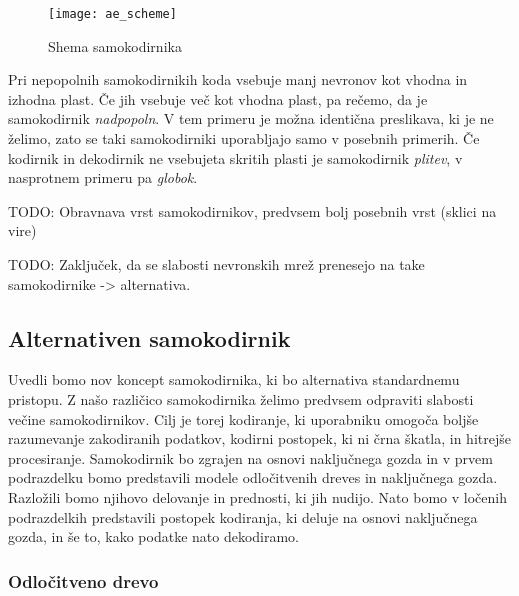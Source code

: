 \documentclass[12pt,a4paper]{article}
\begin{document}
\begin{figure}[h!]

\begin{center}
\texttt{[image: ae\_scheme]}
\end{center}

\caption{Shema samokodirnika}
\end{figure}

Pri nepopolnih samokodirnikih koda vsebuje manj nevronov kot vhodna in izhodna plast. 
Če jih vsebuje več kot vhodna plast, pa rečemo, da je samokodirnik \emph{nadpopoln}. 
V tem primeru je možna identična preslikava, ki je ne želimo, zato se taki samokodirniki uporabljajo samo v posebnih primerih. 
Če kodirnik in dekodirnik ne vsebujeta skritih plasti je samokodirnik \emph{plitev}, v nasprotnem primeru pa \emph{globok}.


TODO: Obravnava vrst samokodirnikov, predvsem bolj posebnih vrst (sklici na vire)

TODO: Zaključek, da se slabosti nevronskih mrež prenesejo na take samokodirnike -> alternativa.



\subsection{Alternativen samokodirnik}

Uvedli bomo nov koncept samokodirnika, ki bo alternativa standardnemu pristopu. 
Z našo različico samokodirnika želimo predvsem odpraviti slabosti večine samokodirnikov. 
Cilj je torej kodiranje, ki uporabniku omogoča boljše razumevanje zakodiranih podatkov, kodirni postopek, ki ni črna škatla, in hitrejše procesiranje. 
Samokodirnik bo zgrajen na osnovi naključnega gozda in v prvem podrazdelku bomo predstavili modele odločitvenih dreves in naključnega gozda. 
Razložili bomo njihovo delovanje in prednosti, ki jih nudijo. 
Nato bomo v ločenih podrazdelkih predstavili postopek kodiranja, ki deluje na osnovi naključnega gozda, in še to, kako podatke nato dekodiramo.



\subsubsection{Odločitveno drevo}
\end{document}
